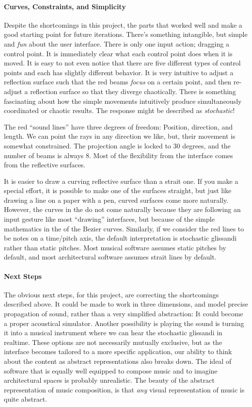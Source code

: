 \paragraph{Curves, Constraints, and Simplicity} Despite the
shortcomings in this project, the parts that worked well and make a
good starting point for future iterations. There's something
intangible, but simple and \textit{fun} about the user
interface. There is only one input action; dragging a control
point. It is immediately clear what each control point does when it is
moved. It is easy to not even notice that there are five different
types of control points and each has slightly different behavior. It
is very intuitive to adjust a reflection surface such that the red
beams \textit{focus} on a certain point, and then re-adjust a
reflection surface so that they diverge chaotically. There is
something fascinating about how the simple movements intuitively
produce simultaneously coordinated or chaotic results. The response
might be described as \textit{stochastic}!

The red ``sound lines'' have three degrees of freedom: Position,
direction, and length. We can point the rays in any direction we like,
but, their movement is somewhat constrained.  The projection angle is
locked to 30 degrees, and the number of beams is always 8. Most of the
flexibility from the interface comes from the reflective surfaces.

It is easier to draw a curving reflective surface than a strait
one. If you make a special effort, it is possible to make one of the
surfaces straight, but just like drawing a line on a paper with a pen,
curved surfaces come more naturally. However, the curves in the  do not
come naturally because they are following an input gesture like most
``drawing'' interfaces, but because of the simple mathematics in the
of the Bezier curves. Similarly, if we consider the red lines to be
notes on a time/pitch axis, the default interpretation is stochastic
glissandi rather than static pitches. Most musical software assumes
static pitches by default, and most architectural software assumes
strait lines by default.

\paragraph{Next Steps}
The obvious next steps, for this project, are correcting the
shortcomings described above. It could be made to work in three
dimensions, and model precise propagation of sound, rather than a very
simplified abstraction: It could become a proper acoustical
simulator. Another possibility is playing the sound is turning it into
a musical instrument where we can hear the stochastic glissandi in
realtime. These options are not necessarily mutually exclusive, but as
the interface becomes tailored to a more specific application, our
ability to think about the content as abstract representations also
breaks down. The ideal of software that is equally well equipped to
compose music and to imagine architectural spaces is probably
unrealistic. The beauty of the abstract representation of music
composition, is that \textit{any} visual representation of music is
quite abstract.

